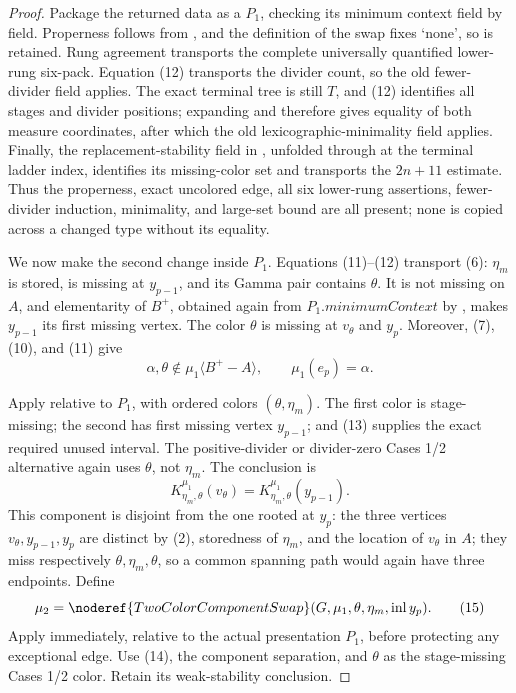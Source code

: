 \begin{proof}
Package the returned data as a
 \(P_1\), checking its
minimum context field by field.  Properness follows from
, and the definition of the swap
fixes `none', so  is retained.  Rung
agreement transports the complete universally quantified lower-rung
six-pack.  Equation (12) transports the divider count, so the old
fewer-divider field applies.  The exact terminal tree is still \(T\),
and (12) identifies all stages and divider positions; expanding
 and
 therefore gives equality of
both measure coordinates, after which the old lexicographic-minimality
field applies.  Finally, the replacement-stability field in
, unfolded through
 at the terminal ladder index, identifies its
missing-color set and transports the \(2n+11\) estimate.  Thus the
properness, exact uncolored edge, all six lower-rung assertions,
fewer-divider induction, minimality, and large-set bound are all present;
none is copied across a changed type without its equality.

We now make the second change inside \(P_1\).  Equations (11)--(12)
transport (6): \(\eta_m\) is stored, is missing at \(y_{p-1}\), and its
Gamma pair contains \(\theta\).  It is not missing on \(A\), and
elementarity of \(B^+\), obtained again from
\(P_1.\mathit{minimumContext}\) by
, makes
\(y_{p-1}\) its first missing vertex.  The color \(\theta\) is missing
at \(v_\theta\) and \(y_p\).  Moreover, (7), (10), and (11) give
\[
 \alpha,\theta\notin\mu_1\langle B^+-A\rangle,\qquad
 \mu_1(e_p)=\alpha.                                        \tag{13}
\]

Apply  relative to \(P_1\), with ordered colors
\((\theta,\eta_m)\).  The first color is stage-missing; the second has
first missing vertex \(y_{p-1}\); and (13) supplies the exact required
unused interval.  The positive-divider or divider-zero Cases 1/2
alternative again uses \(\theta\), not \(\eta_m\).  The conclusion is
\[
 K^{\mu_1}_{\eta_m,\theta}(v_\theta)
       =K^{\mu_1}_{\eta_m,\theta}(y_{p-1}).                  \tag{14}
\]
This component is disjoint from the one rooted at \(y_p\): the three
vertices \(v_\theta,y_{p-1},y_p\) are distinct by (2), storedness of
\(\eta_m\), and the location of \(v_\theta\) in \(A\); they miss
respectively \(\theta,\eta_m,\theta\), so a common spanning path would
again have three endpoints.  Define
\[
 \mu_2=\noderef{TwoColorComponentSwap}
       (G,\mu_1,\theta,\eta_m,\operatorname{inl}y_p).        \tag{15}
\]
Apply  immediately, relative to the
actual presentation \(P_1\), before protecting any exceptional edge.
Use (14), the component separation, and \(\theta\) as the stage-missing
Cases 1/2 color.  Retain its weak-stability conclusion.


\end{proof}
